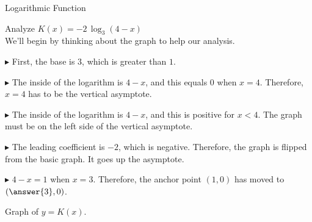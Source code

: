 \documentclass{ximera}
\begin{document}
\begin{example}  Logarithmic Function


Analyze   $K(x) = -2 \, \log_3(4-x)$ \\



We'll begin by thinking about the graph to help our analysis. \\

\begin{explanation}


$\blacktriangleright$ First, the base is $3$, which is greater than $1$.

$\blacktriangleright$ The inside of the logarithm is $4-x$, and this equals $0$ when $x=4$.  Therefore, $x=4$ has to be the vertical asymptote.

$\blacktriangleright$ The inside of the logarithm is $4-x$, and this is positive for $x<4$.  The graph must be on the left side of the vertical asymptote.

$\blacktriangleright$ The leading coefficient is $-2$, which is negative.  Therefore, the graph is flipped  from the basic graph. It goes up the asymptote. 

$\blacktriangleright$ $4-x=1$ when $x=3$. Therefore, the anchor point $(1,0)$ has moved to $\left( \answer{3}, 0 \right)$.





Graph of $y = K(x)$.

\begin{image}
\end{image}
\end{explanation}
\end{example}
\end{document}
